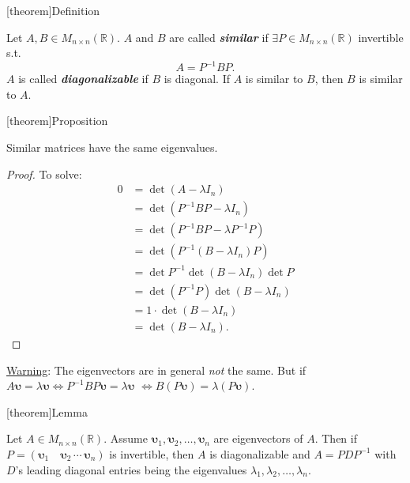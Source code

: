 \documentclass[12pt]{report}
\theoremstyle{definition}
\begin{document}
[theorem]{Definition}
\begin{diagonalization}
    Let $A,B \in M_{n\times n}(\mathbb{R})$. $A$ and $B$ are called \textbf{\emph{similar}} if
    $\exists P \in M_{n\times n}(\mathbb{R})$ invertible s.t.\[
        A = P^{-1}BP.
    \]
    $A$ is called \textbf{\emph{diagonalizable}} if $B$ is diagonal.
    If $A$ is similar to $B$, then $B$ is similar to $A$.
\end{diagonalization}

[theorem]{Proposition}
\begin{similar matrices have the same eigenvalues}
    Similar matrices have the same eigenvalues.
\end{similar matrices have the same eigenvalues}

\begin{proof}
    To solve: \[
        \begin{align*}
            0 & = \det{(A-\lambda I_n)} \\
              & = \det{(P^{-1}BP - \lambda I_n)} \\
              & = \det{(P^{-1}BP - \lambda P^{-1}P)} \\
              & = \det{(P^{-1}(B-\lambda I_n)P)} \\
              & = \det{P^{-1}} \det{(B-\lambda I_n)} \det{P} \\
              & = \det{(P^{-1}P)}\det{(B-\lambda I_n)} \\
              & = 1 \cdot \det{(B-\lambda I_n)} \\
              & = \det{(B-\lambda I_n)}.
        \end{align*}
    \]
\end{proof}

\underline{Warning}: The eigenvectors are in general \emph{not} the same.
But if $A\mathbf{\upsilon} = \lambda \mathbf{\upsilon} \iff P^{-1}BP\mathbf{\upsilon} = \lambda\mathbf{\upsilon}$
$\iff B(P\mathbf{\upsilon}) = \lambda (P\mathbf{\upsilon})$.

[theorem]{Lemma}
\begin{eigenvalues of D}
    Let $A \in M_{n\times n}(\mathbb{R})$. Assume $\mathbf{\upsilon}_1, \mathbf{\upsilon}_2,\ldots,\mathbf{\upsilon}_n$
    are eigenvectors of $A$. Then if $P = (\mathbf{\upsilon}_1 \quad \mathbf{\upsilon}_2 \,\cdots\, \mathbf{\upsilon}_n)$
    is invertible, then $A$ is diagonalizable and $A = PDP^{-1}$ with $D$'s leading
    diagonal entries being the eigenvalues $\lambda_1, \lambda_2, \ldots, \lambda_n$.
\end{eigenvalues of D}
\end{document}
